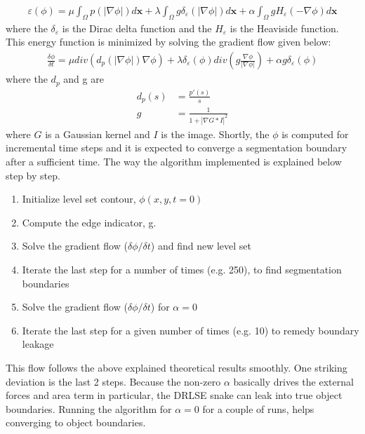 \documentclass{article}
\begin{document}
\begin{align*}
\varepsilon(\phi) = \mu\int_\Omega p(|\nabla \phi | ) d \mathbf{x} +  \lambda\int_\Omega g\delta_{\varepsilon}(|\nabla \phi | ) d \mathbf{x} +  \alpha \int_\Omega g H_{\varepsilon}(- \nabla \phi  ) d \mathbf{x} 
\end{align*}
where the $\delta_{\varepsilon}$ is the Dirac delta function and the $H_{\varepsilon}$ is the Heaviside function. This energy function is minimized by solving the gradient flow given below:
\begin{align*}
\frac{\delta \phi}{\delta t} = \mu div(d_p( |\nabla \phi | ) \nabla \phi ) + \lambda \delta_{\varepsilon}(\phi)div \left( g \frac{\nabla \phi}{|\nabla \phi|} \right) + \alpha g \delta_{\varepsilon}(\phi)
\end{align*}
where the $d_p$ and g are 
\begin{align*}
d_p(s)&=\frac{p'(s)}{s}\\
g &= \frac{1}{1+|\nabla G * I|^2}
\end{align*}
where $G$ is a Gaussian kernel and $I$ is the image. Shortly, the $\phi$ is computed for incremental time steps and it is expected to converge a segmentation boundary after a sufficient time. The way the algorithm implemented is explained below step by step.
\begin{enumerate}
\item Initialize level set contour, $\phi (x,y, t=0)$
\item Compute the edge indicator, g.
\item Solve the gradient flow ($\delta \phi / \delta t$) and find new level set
\item Iterate the last step for a number of times (e.g. 250), to find segmentation boundaries
\item Solve the gradient flow ($\delta \phi / \delta t$)  for $\alpha=0$
\item Iterate the last step for a given number of times (e.g. 10) to remedy boundary leakage
\end{enumerate}
This flow follows the above explained theoretical results smoothly. One striking deviation is the last 2 steps. Because the non-zero $\alpha$ basically drives the external forces and area term in particular, the DRLSE snake can leak into true object boundaries. Running the algorithm for $\alpha=0$ for a couple of runs, helps converging to object boundaries. 
\end{document}
